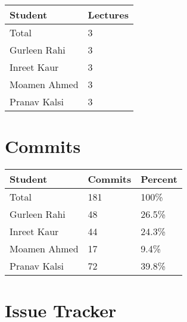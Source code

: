 \documentclass{article}
\begin{document}

\begin{table}[H]
\centering
\begin{tabular}{ll}
\toprule
\textbf{Student} & \textbf{Lectures}\\
\midrule
Total & 3\\
Gurleen Rahi & 3\\
Inreet Kaur & 3\\
Moamen Ahmed & 3\\
Pranav Kalsi & 3\\
\bottomrule
\end{tabular}
\end{table}


\section{Commits}


\begin{table}[H]
\centering
\begin{tabular}{lll}
\toprule
\textbf{Student} & \textbf{Commits} & \textbf{Percent}\\
\midrule
Total & 181 & 100\% \\
Gurleen Rahi & 48 & 26.5\% \\
Inreet Kaur & 44 & 24.3\% \\
Moamen Ahmed & 17 & 9.4\% \\
Pranav Kalsi & 72 & 39.8\% \\
\bottomrule
\end{tabular}
\end{table}


\section{Issue Tracker}
\end{document}

